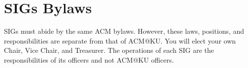 \section{SIGs Bylaws}
SIGs must abide by the same ACM bylaws. However, these laws, positions, and
responsibilities are separate from that of ACM@KU. You will elect your own Chair,
Vice Chair, and Treasurer. The operations of each SIG are the responsibilities
of its officers and not ACM@KU officers.

